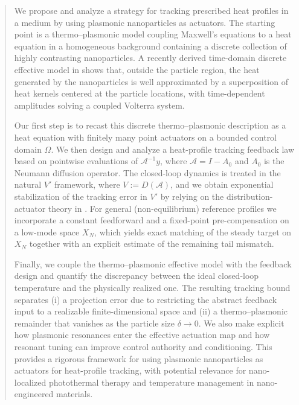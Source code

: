 \documentclass[11pt,a4paper]{article}
\numberwithin{equation}{section}
\theoremstyle{definition}
\newcommand{\1}{\mathbbm{1}}
\begin{document}
\begin{abstract}

We propose and analyze a strategy for tracking prescribed heat profiles in a
medium by using plasmonic nanoparticles as actuators. The starting point is a
thermo--plasmonic model coupling Maxwell's equations to a heat equation in a
homogeneous background containing a discrete collection of highly contrasting
nanoparticles. A recently derived time-domain discrete effective model in \cite{CaoMukherjeeSini2025} shows
that, outside the particle region, the heat generated by the nanoparticles is
well approximated by a superposition of heat kernels centered at the particle
locations, with time-dependent amplitudes solving a coupled Volterra system.

\medskip
\noindent
Our first step is to recast this discrete thermo--plasmonic description as a
heat equation with finitely many point actuators on a bounded control domain
$\Omega$. We then design and analyze a heat-profile
tracking feedback law based on pointwise evaluations of $\mathcal A^{-1}y$,
where $\mathcal A=I-A_0$ and $A_0$ is the Neumann diffusion operator. The
closed-loop dynamics is treated in the natural $V'$ framework, where $V := D(\mathcal A)$, and we obtain
exponential stabilization of the tracking error in $V'$ by relying on the
distribution-actuator theory in \cite{KunRodWal24-cocv}. For general
(non-equilibrium) reference profiles we incorporate a constant feedforward and
a fixed-point pre-compensation on a low-mode space $X_N$, which yields exact
matching of the steady target on $X_N$ together with an explicit estimate of
the remaining tail mismatch.

\medskip
\noindent
Finally, we couple the thermo--plasmonic effective model with the feedback
design and quantify the discrepancy between the ideal closed-loop temperature
and the physically realized one. The resulting tracking bound separates (i) a
projection error due to restricting the abstract feedback input to a
realizable finite-dimensional space and (ii) a thermo--plasmonic remainder
that vanishes as the particle size $\delta\to0$. We also make explicit how
plasmonic resonances enter the effective actuation map and how resonant tuning
can improve control authority and conditioning. This provides a rigorous
framework for using plasmonic nanoparticles as actuators for heat-profile
tracking, with potential relevance for nano-localized photothermal therapy and
temperature management in nano-engineered materials.



\end{abstract}
\end{document}
